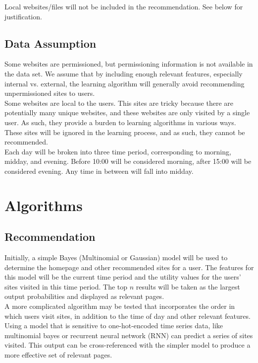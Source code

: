 \documentclass{article}
\begin{document}
Local websites/files will not be included in the recommendation. See below for 
justification. \\

\subsection*{Data Assumption} 
Some websites are permissioned, but permissioning information is not available
in the data set. We assume that by including enough relevant features, especially
internal vs. external, the learning algorithm will generally avoid recommending
unpermissioned sites to users. \\

Some websites are local to the users. This sites are tricky because there are 
potentially many unique websites, and these websites are only visited by a 
single user. As such, they provide a burden to learning algorithms in various
ways. These sites will be ignored in the learning process, and as such, they 
cannot be recommended. \\

Each day will be broken into three time period, corresponding to morning, midday,
and evening. Before 10:00 will be considered morning, after 15:00 will be considered
evening. Any time in between will fall into midday. 


\clearpage
\section*{Algorithms}
\subsection*{Recommendation}
Initially, a simple Bayes (Multinomial or Gaussian) model will be used to 
determine the homepage and other recommended sites for a user. The features
for this model will be the current time period and the utility values for the 
users' sites visited in this time period. The top $n$ results will be taken
as the largest output probabilities and displayed as relevant pages. \\

A more complicated algorithm may be tested that incorporates the order in which
users visit sites, in addition to the time of day and other relevant features. 
Using a model that is sensitive to one-hot-encoded time series data, like multinomial
bayes or recurrent neural network (RNN) can predict a series of sites visited.
This output can be cross-referenced with the simpler model to produce a more
effective set of relevant pages. \\
\end{document}
